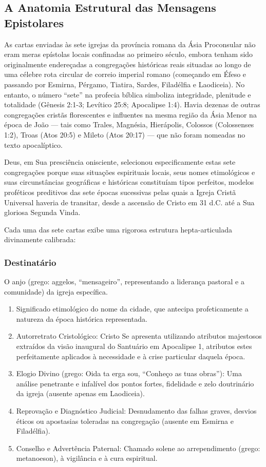 \subsection{A Anatomia Estrutural das Mensagens Epistolares}


As cartas enviadas às sete igrejas da província romana da Ásia Proconsular não eram meras epístolas locais confinadas ao primeiro século, embora tenham sido originalmente endereçadas a congregações históricas reais situadas ao longo de uma célebre rota circular de correio imperial romano (começando em Éfeso e passando por Esmirna, Pérgamo, Tiatira, Sardes, Filadélfia e Laodiceia). No entanto, o número ``sete'' na profecia bíblica simboliza integridade, plenitude e totalidade (Gênesis 2:1-3; Levítico 25:8; Apocalipse 1:4). Havia dezenas de outras congregações cristãs florescentes e influentes na mesma região da Ásia Menor na época de João — tais como Trales, Magnésia, Hierápolis, Colossos (Colossenses 1:2), Troas (Atos 20:5) e Mileto (Atos 20:17) — que não foram nomeadas no texto apocalíptico.

Deus, em Sua presciência onisciente, selecionou especificamente estas sete congregações porque suas situações espirituais locais, seus nomes etimológicos e suas circunstâncias geográficas e históricas constituíam tipos perfeitos, modelos proféticos preditivos das sete épocas sucessivas pelas quais a Igreja Cristã Universal haveria de transitar, desde a ascensão de Cristo em 31 d.C. até a Sua gloriosa Segunda Vinda.

Cada uma das sete cartas exibe uma rigorosa estrutura hepta-articulada divinamente calibrada:

\subsubsection*{Destinatário}
O anjo (grego: aggelos, ``mensageiro'', representando a liderança pastoral e a comunidade) da igreja específica.
\begin{enumerate}
  \item Significado etimológico do nome da cidade, que antecipa profeticamente a natureza da época histórica representada.
  \item Autorretrato Cristológico: Cristo Se apresenta utilizando atributos majestosos extraídos da visão inaugural do Santuário em Apocalipse 1, atributos estes perfeitamente aplicados à necessidade e à crise particular daquela época.
  \item Elogio Divino (grego: Oida ta erga sou, ``Conheço as tuas obras''): Uma análise penetrante e infalível dos pontos fortes, fidelidade e zelo doutrinário da igreja (ausente apenas em Laodiceia).
  \item Reprovação e Diagnóstico Judicial: Desnudamento das falhas graves, desvios éticos ou apostasias toleradas na congregação (ausente em Esmirna e Filadélfia).
  \item Conselho e Advertência Paternal: Chamado solene ao arrependimento (grego: metanoeson), à vigilância e à cura espiritual.
\end{enumerate}

